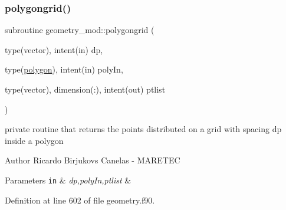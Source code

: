 \subsubsection{\texorpdfstring{polygongrid()}{polygongrid()}}
{\footnotesize\ttfamily subroutine geometry\+\_\+mod\+::polygongrid (\begin{DoxyParamCaption}\item[{type(vector), intent(in)}]{dp,  }\item[{type(\mbox{\hyperlink{structgeometry__mod_1_1polygon}{polygon}}), intent(in)}]{poly\+In,  }\item[{type(vector), dimension(\+:), intent(out)}]{ptlist }\end{DoxyParamCaption})\hspace{0.3cm}{\ttfamily [private]}}



private routine that returns the points distributed on a grid with spacing dp inside a polygon 

\begin{DoxyAuthor}{Author}
Ricardo Birjukovs Canelas -\/ M\+A\+R\+E\+T\+EC 
\end{DoxyAuthor}

\begin{DoxyParams}[1]{Parameters}
\mbox{\tt in}  & {\em dp,poly\+In,ptlist} & \\
\hline
\end{DoxyParams}


Definition at line 602 of file geometry.\+f90.


